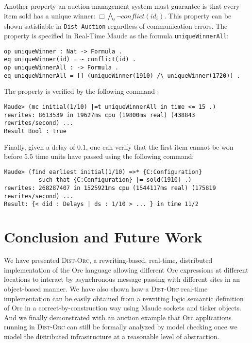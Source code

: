 \documentclass{eptcs}
\begin{document}
Another property an auction management system must guarantee is that every item sold has a unique winner: $\Box \bigwedge_{i} \neg \mathit{conflict(id_{i})}$. This property can be shown satisfiable in \texttt{Dist-Auction} regardless of communication errors. The property is specified in Real-Time Maude as the formula \texttt{uniqueWinnerAll}:

\begin{small}
\begin{verbatim}
op uniqueWinner : Nat -> Formula .
eq uniqueWinner(id) = ~ conflict(id) .
op uniqueWinnerAll : -> Formula .
eq uniqueWinnerAll = [] (uniqueWinner(1910) /\ uniqueWinner(1720)) .
\end{verbatim}
\end{small}

The property is verified by the following command :


\begin{small}
\begin{verbatim}
Maude> (mc initial(1/10) |=t uniqueWinnerAll in time <= 15 .)
rewrites: 8613539 in 19627ms cpu (19800ms real) (438843 rewrites/second) ...
Result Bool : true
\end{verbatim}
\end{small}

Finally, given a delay of $0.1$, one can verify that the first item cannot be won before $5.5$ time units have passed using the following command: 

\begin{small}
\begin{verbatim}
Maude> (find earliest initial(1/10) =>* {C:Configuration} 
          such that {C:Configuration} |= sold(1910) .)
rewrites: 268287407 in 1525921ms cpu (1544117ms real) (175819 rewrites/second) ...
Result:	{< did : Delays | ds : 1/10 > ... } in time 11/2
\end{verbatim}
\end{small}





\section{Conclusion and Future Work} \label{sec:concl}



We have presented \textsc{Dist-Orc}, a rewriting-based, real-time, distributed implementation of the Orc language allowing different Orc expressions at different locations to interact by asynchronous message passing with different sites in an object-based manner.  We have also shown how a \textsc{Dist-Orc} real-time implementation can be easily obtained from a rewriting logic semantic definition of Orc in a correct-by-construction way using Maude sockets and ticker objects.  And we finally demonstrated with an auction example that Orc applications running in \textsc{Dist-Orc} can still be formally analyzed by model checking once we model the distributed infrastructure at a reasonable level of abstraction.
\end{document}
